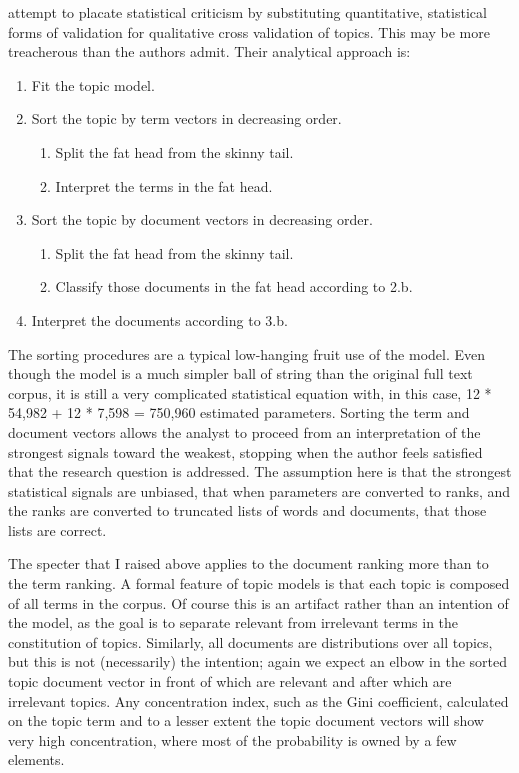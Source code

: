 \documentclass[]{book}
\providecommand{\tightlist}{%
  \setlength{\itemsep}{0pt}\setlength{\parskip}{0pt}}
\theoremstyle{definition}
\theoremstyle{definition}
\theoremstyle{definition}
\theoremstyle{remark}
\begin{document}
\citet{DiMaggio2013Exploiting} attempt to placate statistical criticism
by substituting quantitative, statistical forms of validation for
qualitative cross validation of topics. This may be more treacherous
than the authors admit. Their analytical approach is:

\begin{enumerate}
\def\labelenumi{\arabic{enumi}.}
\tightlist
\item
  Fit the topic model.
\item
  Sort the topic by term vectors in decreasing order.

  \begin{enumerate}
  \def\labelenumii{\alph{enumii}.}
  \tightlist
  \item
    Split the fat head from the skinny tail.
  \item
    Interpret the terms in the fat head.
  \end{enumerate}
\item
  Sort the topic by document vectors in decreasing order.

  \begin{enumerate}
  \def\labelenumii{\alph{enumii}.}
  \tightlist
  \item
    Split the fat head from the skinny tail.
  \item
    Classify those documents in the fat head according to 2.b.
  \end{enumerate}
\item
  Interpret the documents according to 3.b.
\end{enumerate}

The sorting procedures are a typical low-hanging fruit use of the model.
Even though the model is a much simpler ball of string than the original
full text corpus, it is still a very complicated statistical equation
with, in this case, 12 * 54,982 + 12 * 7,598 = 750,960 estimated
parameters. Sorting the term and document vectors allows the analyst to
proceed from an interpretation of the strongest signals toward the
weakest, stopping when the author feels satisfied that the research
question is addressed. The assumption here is that the strongest
statistical signals are unbiased, that when parameters are converted to
ranks, and the ranks are converted to truncated lists of words and
documents, that those lists are correct.

The specter that I raised above applies to the document ranking more
than to the term ranking. A formal feature of topic models is that each
topic is composed of all terms in the corpus. Of course this is an
artifact rather than an intention of the model, as the goal is to
separate relevant from irrelevant terms in the constitution of topics.
Similarly, all documents are distributions over all topics, but this is
not (necessarily) the intention; again we expect an elbow in the sorted
topic document vector in front of which are relevant and after which are
irrelevant topics. Any concentration index, such as the Gini
coefficient, calculated on the topic term and to a lesser extent the
topic document vectors will show very high concentration, where most of
the probability is owned by a few elements.
\end{document}
